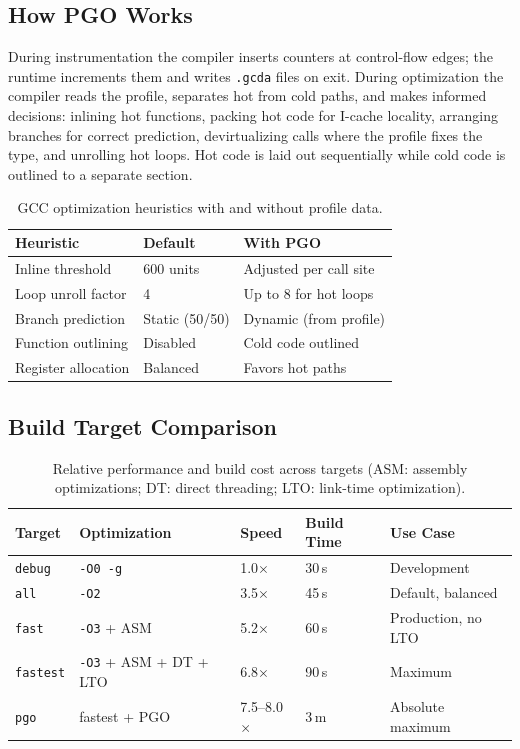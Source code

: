 \subsection{How PGO Works}

During instrumentation the compiler inserts counters at control-flow edges;
the runtime increments them and writes \texttt{.gcda} files on exit. During
optimization the compiler reads the profile, separates hot from cold paths,
and makes informed decisions: inlining hot functions, packing hot code for
I-cache locality, arranging branches for correct prediction, devirtualizing
calls where the profile fixes the type, and unrolling hot loops. Hot code is
laid out sequentially while cold code is outlined to a separate section.

\begin{table}[h]
\centering
\begin{tabular}{lll}
\toprule
Heuristic & Default & With PGO \\
\midrule
Inline threshold & 600 units & Adjusted per call site \\
Loop unroll factor & 4 & Up to 8 for hot loops \\
Branch prediction & Static (50/50) & Dynamic (from profile) \\
Function outlining & Disabled & Cold code outlined \\
Register allocation & Balanced & Favors hot paths \\
\bottomrule
\end{tabular}
\caption{GCC optimization heuristics with and without profile data.}
\end{table}

\subsection{Build Target Comparison}

\begin{table}[h]
\centering
\begin{tabular}{lllll}
\toprule
Target & Optimization & Speed & Build Time & Use Case \\
\midrule
\texttt{debug} & \texttt{-O0 -g} & 1.0$\times$ & 30\,s & Development \\
\texttt{all} & \texttt{-O2} & 3.5$\times$ & 45\,s & Default, balanced \\
\texttt{fast} & \texttt{-O3} + ASM & 5.2$\times$ & 60\,s & Production, no LTO \\
\texttt{fastest} & \texttt{-O3} + ASM + DT + LTO & 6.8$\times$ & 90\,s & Maximum \\
\texttt{pgo} & fastest + PGO & 7.5--8.0$\times$ & 3\,m & Absolute maximum \\
\bottomrule
\end{tabular}
\caption{Relative performance and build cost across targets (ASM: assembly
optimizations; DT: direct threading; LTO: link-time optimization).}
\end{table}

